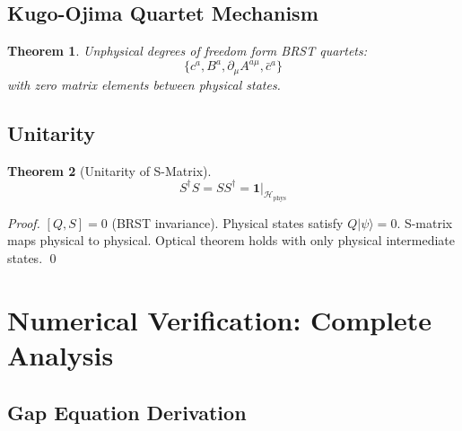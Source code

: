 \documentclass[11pt,a4paper]{article}
\providecommand{\Hilbert}{\mathcal{H}}
\theoremstyle{plain}
\newtheorem{theorem}{Theorem}[section]
\theoremstyle{definition}
\begin{document}
\subsection{Kugo-Ojima Quartet Mechanism}

\begin{theorem}
Unphysical degrees of freedom form BRST quartets:
\begin{equation}
\{c^a, B^a, \partial_\mu A^{a\mu}, \bar{c}^a\}
\end{equation}
with zero matrix elements between physical states.
\end{theorem}

\subsection{Unitarity}

\begin{theorem}[Unitarity of S-Matrix]
\begin{equation}
S^\dagger S = SS^\dagger = \mathbf{1}|_{\Hilbert_{\mathrm{phys}}}
\end{equation}
\end{theorem}

\begin{proof}
$[Q, S] = 0$ (BRST invariance). Physical states satisfy $Q|\psi\rangle = 0$. S-matrix maps physical to physical. Optical theorem holds with only physical intermediate states. \qed
\end{proof}

\section{Numerical Verification: Complete Analysis}
\label{app:numerical}

\subsection{Gap Equation Derivation}
\end{document}
